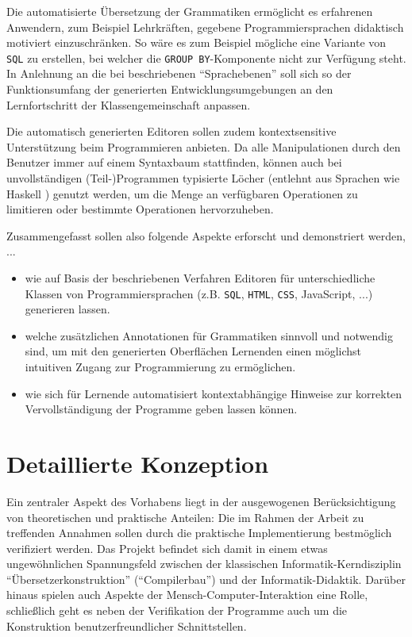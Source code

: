 \documentclass[paper=a4,fontsize=12pt,parskip=half]{scrartcl}
\begin{document}
Die automatisierte Übersetzung der Grammatiken ermöglicht es erfahrenen Anwendern, zum Beispiel Lehrkräften, gegebene Programmiersprachen didaktisch motiviert einzuschränken. So wäre es zum Beispiel mögliche eine Variante von \texttt{SQL} zu erstellen, bei welcher die \texttt{GROUP BY}-Komponente nicht zur Verfügung steht. In Anlehnung an die bei \cite{klaeren_macht_2007} beschriebenen \enquote{Sprachebenen} soll sich so der Funktionsumfang der generierten Entwicklungsumgebungen an den Lernfortschritt der Klassengemeinschaft anpassen.

Die automatisch generierten Editoren sollen zudem kontextsensitive Unterstützung beim Programmieren anbieten. Da alle Manipulationen durch den Benutzer immer auf einem Syntaxbaum stattfinden, können auch bei unvollständigen (Teil-)Programmen typisierte Löcher (entlehnt aus Sprachen wie Haskell \cite{jones_haskell_2014}) genutzt werden, um die Menge an verfügbaren Operationen zu limitieren oder bestimmte Operationen hervorzuheben.

Zusammengefasst sollen also folgende Aspekte erforscht und demonstriert werden, ...

\begin{itemize}
\item wie auf Basis der beschriebenen Verfahren Editoren für unterschiedliche Klassen von Programmiersprachen (z.B. \texttt{SQL}, \texttt{HTML}, \texttt{CSS}, JavaScript, ...) generieren lassen.
\item welche zusätzlichen Annotationen für Grammatiken sinnvoll und notwendig sind, um mit den generierten Oberflächen Lernenden einen möglichst intuitiven Zugang zur Programmierung zu ermöglichen.
\item wie sich für Lernende automatisiert kontextabhängige Hinweise zur korrekten Vervollständigung der Programme geben lassen können.
\end{itemize}


\section{Detaillierte Konzeption}

Ein zentraler Aspekt des Vorhabens liegt in der ausgewogenen Berücksichtigung von theoretischen und praktische Anteilen: Die im Rahmen der Arbeit zu treffenden Annahmen sollen durch die praktische Implementierung bestmöglich verifiziert werden. Das Projekt befindet sich damit in einem etwas ungewöhnlichen Spannungsfeld zwischen der klassischen Informatik-Kerndisziplin \enquote{Übersetzerkonstruktion} (\enquote{Compilerbau}) und der Informatik-Didaktik. Darüber hinaus spielen auch Aspekte der Mensch-Computer-Interaktion eine Rolle, schließlich geht es neben der Verifikation der Programme auch um die Konstruktion benutzerfreundlicher Schnittstellen.
\end{document}
